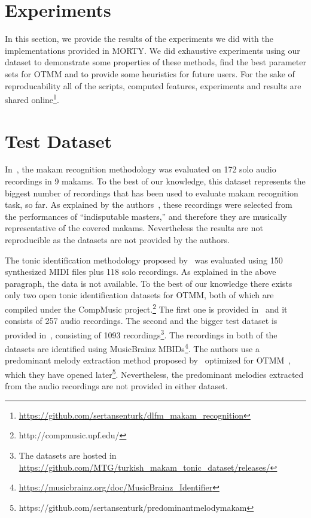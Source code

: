 \documentclass{sig-alternate}
\begin{document}
\section{Experiments}\label{sec:experiments}
In this section, we provide the results of the experiments we did with the implementations provided in MORTY. We did exhaustive experiments using our dataset to demonstrate some properties of these methods, find the best parameter sets for OTMM and to provide some heuristics for future users. For the sake of reproducability all of the scripts, computed features, experiments and results are shared online\footnote{\url{https://github.com/sertansenturk/dlfm_makam_recognition}}.

\section{Test Dataset}\label{sec:dataset}

In~\cite{bozkurt_makam}, the makam recognition methodology was evaluated on 172 solo audio recordings in 9 makams. To the best of our knowledge, this dataset represents the biggest number of recordings that has been used to evaluate makam recognition task, so far. As explained by the authors~\cite{bozkurt_makam}, these recordings were selected from the performances of ``indisputable masters,'' and therefore they are musically representative of the covered makams. Nevertheless the results are not reproducible as the datasets are not provided by the authors. 

The tonic identification methodology proposed by~\cite{bozkurt_makam} was evaluated using 150 synthesized MIDI files plus 118 solo recordings. As explained in the above paragraph, the data is not available. To the best of our knowledge there exists only two open tonic identification datasets for OTMM, both of which are compiled under the CompMusic project.\footnote{http://compmusic.upf.edu/} The first one is provided in~\cite{senturk2013karar_ismir} and it consists of 257 audio recordings. The second and the bigger test dataset is provided in~\cite{sercan_tonic}, consisting of 1093 recordings\footnote{The datasets are hosted in \url{https://github.com/MTG/turkish_makam_tonic_dataset/releases/}}. The recordings in both of the datasets are identified using MusicBrainz MBIDs\footnote{\url{https://musicbrainz.org/doc/MusicBrainz_Identifier}}. The authors use a predominant me\-lody extraction method proposed by~\cite{salamon2012melody} optimized for OTMM~\cite{atli2014makamFeature_atmm}, which they have opened later\footnote{https://github.com/sertansenturk/predominantmelodymakam}. Nevertheless, the predominant melodies extracted from the audio recordings are not provided in either dataset.
 
\end{document}
